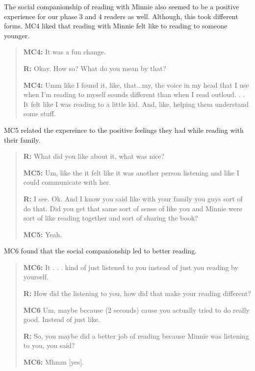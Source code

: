 \documentclass{sigchi}
\begin{document}
 The social companionship of reading with Minnie also seemed to be a positive experience for our phase 3 and 4 readers as well.  Although, this took different forms.  MC4 liked that reading with Minnie felt like to reading to someone younger.
 
 \begin{quote}
 	 \textbf{MC4:} It was a fun change. 
 	 
 	 \textbf{R:} Okay. How so? What do you mean by that?
 	 
 	 \textbf{MC4:} Umm like I found it, like, that...my, the voice in my head that I use when I'm reading to myself sounds different than when I read outloud. . . It felt like I was reading to a little kid. And, like, helping them understand some stuff.
 	 \end{quote}
 	 
MC5 related the expereince to the positive feelings they had while reading with their family.

	\begin{quote}
		
		\textbf{R:} What did you like about it, what was nice?
		 
		 \textbf{MC5:} Um, like the it felt like it was another person listening and like I could communicate with her.
		 
		 \textbf{R:} I see. Ok. And I know you said like with your family you 	guys sort of do that. Did you get that same sort of sense of like you and Minnie were sort of like reading together and sort of sharing the book?
		 
		 \textbf{MC5:} Yeah.
	\end{quote}

MC6 found that the social companionship led to better reading.

	\begin{quote} 	
		 \textbf{MC6:} It . . .  kind of just listened to you instead of just you reading by yourself.
		 
		 \textbf{R:} How did the listening to you, how did that make your reading different?
		 
		 \textbf{MC6} Um, maybe because (2 seconds) cause you actually tried to do really good. Instead of just like.
		 
		 \textbf{R:} So, you maybe did a better job of reading because Minnie was listening to you, you said?
		 
		 \textbf{MC6:} Mhmm [yes]. 
 \end{quote}
 
\end{document}
